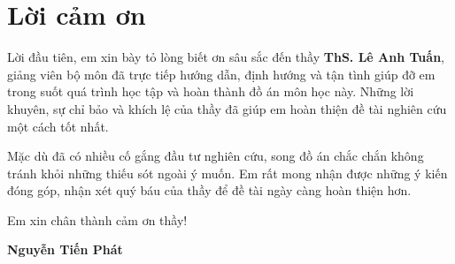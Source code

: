 \chapter*{Lời cảm ơn}

Lời đầu tiên, em xin bày tỏ lòng biết ơn sâu sắc đến thầy \textbf{ThS. Lê Anh Tuấn}, giảng viên bộ môn đã trực tiếp hướng dẫn, định hướng và tận tình giúp đỡ em trong suốt quá trình học tập và hoàn thành đồ án môn học này. Những lời khuyên, sự chỉ bảo và khích lệ của thầy đã giúp em hoàn thiện đề tài nghiên cứu một cách tốt nhất.

Mặc dù đã có nhiều cố gắng đầu tư nghiên cứu, song đồ án chắc chắn không tránh khỏi những thiếu sót ngoài ý muốn. Em rất mong nhận được những ý kiến đóng góp, nhận xét quý báu của thầy để đề tài ngày càng hoàn thiện hơn.

Em xin chân thành cảm ơn thầy!

\vspace{1cm}
\begin{flushright}
    \textbf{Nguyễn Tiến Phát}
\end{flushright}